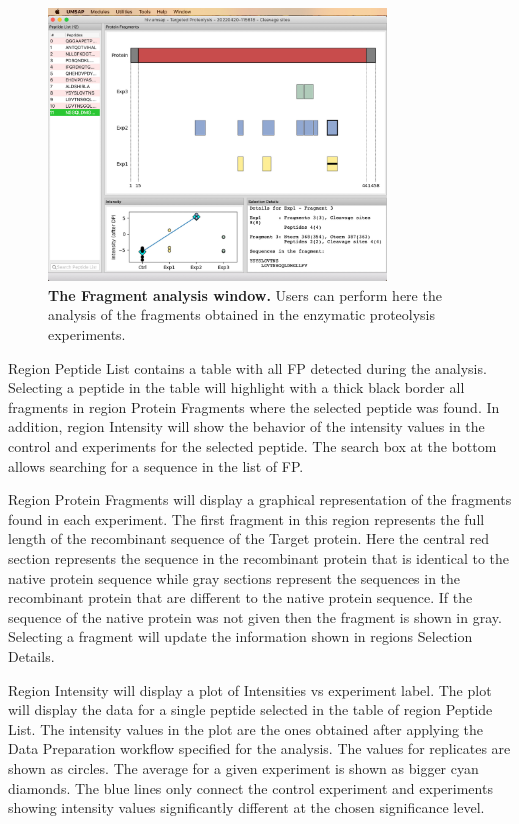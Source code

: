 \begin{figure}[h]
    \centering
    \includegraphics[width=0.8\textwidth]{./IMAGES/MOD-TARPROT/tarprot-frag.jpg}
    \caption[The Fragment analysis window]{\textbf{The Fragment analysis window.}
    Users can perform here the analysis of the fragments obtained in the enzymatic
    proteolysis experiments.}
    \label{fig:tarprotFra}
    \vspace{-5pt}
\end{figure} 

Region Peptide List contains a table with all FP detected during the analysis. Selecting
a peptide in the table will highlight with a thick black border all fragments in
region Protein Fragments where the selected peptide was found. In addition, region
Intensity will show the behavior of the intensity values in the control and experiments
for the selected peptide. The search box at the bottom allows searching for a sequence
in the list of FP.

Region Protein Fragments will display a graphical representation of the fragments
found in each experiment. The first fragment in this region represents the full length
of the recombinant sequence of the Target protein. Here the central red section represents
the sequence in the recombinant protein that is identical to the native protein sequence
while gray sections represent the sequences in the recombinant protein that are different
to the native protein sequence. If the sequence of the native protein was not given
then the fragment is shown in gray. Selecting a fragment will update the information
shown in regions Selection Details.

Region Intensity will display a plot of Intensities vs experiment label. The plot
will display the data for a single peptide selected in the table of region Peptide
List. The intensity values in the plot are the ones obtained after applying the Data
Preparation workflow specified for the analysis. The values for replicates are shown
as circles. The average for a given experiment is shown as bigger cyan diamonds.
The blue lines only connect the control experiment and experiments showing intensity
values significantly different at the chosen significance level.

